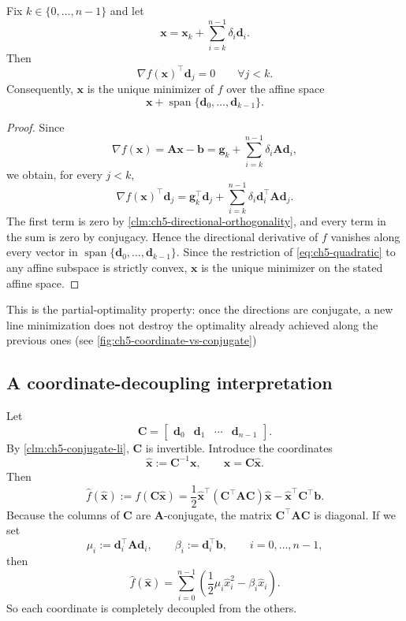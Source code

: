 \begin{claim}
\label{clm:ch5-partial-optimality}
Fix $k\in\{0,\ldots,n-1\}$ and let
\[
  \mathbf{x}
  =\mathbf{x}_k+\sum_{i=k}^{n-1}\delta_i \mathbf{d}_i.
\]
Then
\[
  \nabla f(\mathbf{x})^{\top}\mathbf{d}_j=0
  \qquad \forall j<k.
\]
Consequently, $\mathbf{x}$ is the unique minimizer of $f$ over the affine space
\[
  \mathbf{x}+\operatorname{span}\{\mathbf{d}_0,\ldots,\mathbf{d}_{k-1}\}.
\]
\end{claim}
\begin{proof}
Since
\[
  \nabla f(\mathbf{x})
  =\mathbf{A}\mathbf{x}-\mathbf{b}
  =\mathbf{g}_k+\sum_{i=k}^{n-1}\delta_i \mathbf{A}\mathbf{d}_i,
\]
we obtain, for every $j<k$,
\[
  \nabla f(\mathbf{x})^{\top}\mathbf{d}_j
  =\mathbf{g}_k^{\top}\mathbf{d}_j
  +\sum_{i=k}^{n-1}\delta_i \mathbf{d}_i^{\top}\mathbf{A}\mathbf{d}_j.
\]
The first term is zero by \cref{clm:ch5-directional-orthogonality}, and every
term in the sum is zero by conjugacy. Hence the directional derivative of $f$
vanishes along every vector in
$\operatorname{span}\{\mathbf{d}_0,\ldots,\mathbf{d}_{k-1}\}$. Since the
restriction of \eqref{eq:ch5-quadratic} to any affine subspace is strictly
convex, $\mathbf{x}$ is the unique minimizer on the stated affine space.
\end{proof}

This is the partial-optimality property: once the
directions are conjugate, a new line minimization does not destroy the
optimality already achieved along the previous ones (see 
\cref{fig:ch5-coordinate-vs-conjugate})
\subsection{A coordinate-decoupling interpretation}
Let
\[
  \mathbf{C}=
  \begin{bmatrix}
    \mathbf{d}_0 & \mathbf{d}_1 & \cdots & \mathbf{d}_{n-1}
  \end{bmatrix}.
\]
By \cref{clm:ch5-conjugate-li}, $\mathbf{C}$ is invertible. Introduce the
coordinates
\[
  \hat{\mathbf{x}}:=\mathbf{C}^{-1}\mathbf{x},
  \qquad
  \mathbf{x}=\mathbf{C}\hat{\mathbf{x}}.
\]
Then
\[
  \hat f(\hat{\mathbf{x}})
  :=f(\mathbf{C}\hat{\mathbf{x}})
  =\frac12 \hat{\mathbf{x}}^{\top}(\mathbf{C}^{\top}\mathbf{A}\mathbf{C})\hat{\mathbf{x}}
  -\hat{\mathbf{x}}^{\top}\mathbf{C}^{\top}\mathbf{b}.
\]
Because the columns of $\mathbf{C}$ are $\mathbf{A}$-conjugate, the matrix
$\mathbf{C}^{\top}\mathbf{A}\mathbf{C}$ is diagonal. If we set
\[
  \mu_i:=\mathbf{d}_i^{\top}\mathbf{A}\mathbf{d}_i,
  \qquad
  \beta_i:=\mathbf{d}_i^{\top}\mathbf{b},
  \qquad i=0,\ldots,n-1,
\]
then
\[
  \hat f(\hat{\mathbf{x}})
  =\sum_{i=0}^{n-1}\left(\frac12 \mu_i \hat x_i^2-\beta_i \hat x_i\right).
\]
So each coordinate is completely decoupled from the others.

